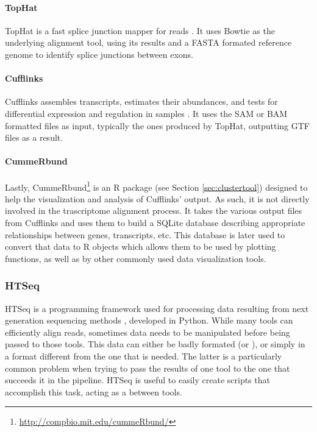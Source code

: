 \paragraph{TopHat}

TopHat is a fast splice junction mapper for \rnaseq{} reads
\cite{Trapnell01052009}. It uses Bowtie as the underlying alignment tool, using
its results and a FASTA formated reference genome to identify splice junctions
between exons.

\paragraph{Cufflinks}

Cufflinks assembles transcripts, estimates their abundances, and tests for
differential expression and regulation in \rnaseq{} samples
\cite{trapnell2010transcript}. It uses the SAM or BAM formatted files as input,
typically the ones produced by TopHat, outputting GTF files as a result.

\paragraph{CummeRbund}

Lastly, CummeRbund\footnote{\url{http://compbio.mit.edu/cummeRbund/}} is an R
package (see Section \ref{sec:clustertool}) designed to help the visualization and
analysis of Cufflinks' \rnaseq{} output. As such, it is not directly involved in
the trascriptome alignment process. It takes the various output files from
Cufflinks and uses them to build a SQLite database describing appropriate
relationships between genes, transcripts, etc. This database is later used to
convert that data to R objects which allows them to be used by plotting
functions, as well as by other commonly used data visualization tools.

\subsubsection*{HTSeq}

HTSeq is a programming framework used for processing data resulting from next
generation sequencing methods \cite{htseq}, developed in Python. While many
tools can efficiently align reads, sometimes data needs to be manipulated before
being passed to those tools. This data can either be badly formated (or
), or simply in a format different from the one that is needed. The
latter is a particularly common problem when trying to pass the results of one
tool to the one that succeeds it in the pipeline. HTSeq is useful to easily
create scripts that accomplish this task, acting as a  between tools.

